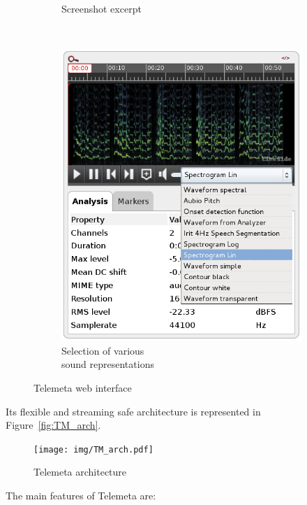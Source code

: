 \documentclass{sig-alternate}
\begin{document}
\begin{figure}[htb]
   \centering
   \begin{subfigure}[b]{0.7\textwidth}
     \caption{Screenshot excerpt}
     \label{fig:Telemeta}
   \end{subfigure}%
 ~ %
\begin{subfigure}[b]{0.3\textwidth}
  \centering
  \includegraphics[width=0.9\linewidth]{img/sound_representation.png}
  \caption{Selection of various \\sound representations}
  \label{fig:sound_representation}
\end{subfigure}
\caption{Telemeta web interface}
 \end{figure}
Its flexible and streaming safe architecture is represented in Figure~\ref{fig:TM_arch}.
\begin{figure}[htb]
  \centering
  \texttt{[image: img/TM\_arch.pdf]}
  \caption{Telemeta architecture}\label{fig:TM_arch}
  \label{fig:screenshot}
\end{figure}
The main features of Telemeta are:
\end{document}
